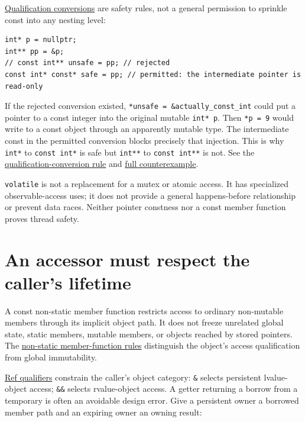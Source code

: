 \hyperref[appendix-5e1a7561cd98]{Qualification conversions} are safety rules, not a general permission to sprinkle const into any nesting level:

\begin{verbatim}
int* p = nullptr;
int** pp = &p;
// const int** unsafe = pp; // rejected
const int* const* safe = pp; // permitted: the intermediate pointer is read-only
\end{verbatim}

If the rejected conversion existed, \texttt{*unsafe\ =\ \&actually\_const\_int} could put a pointer to a const integer into the original mutable \texttt{int*\ p}. Then \texttt{*p\ =\ 9} would write to a const object through an apparently mutable type. The intermediate const in the permitted conversion blocks precisely that injection. This is why \texttt{int*} to \texttt{const\ int*} is safe but \texttt{int**} to \texttt{const\ int**} is not. See the \href{https://eel.is/c++draft/conv.qual}{qualification-conversion rule} and \hyperref[01-foundations-i-ch011-c---qualification-safety-and-borrow-intervals]{full counterexample}.

\texttt{volatile} is not a replacement for a mutex or atomic access. It has specialized observable-access uses; it does not provide a general happens-before relationship or prevent data races. Neither pointer constness nor a const member function proves thread safety.

\section{An accessor must respect the caller's lifetime}\label{01-foundations-i-ch003-an-accessor-must-respect-the-callers-lifetime}

\hypertarget{01-foundations-i-ch003-an-accessor-must-respect-the-callers-lifetime}{}

A const non-static member function restricts access to ordinary non-mutable members through its implicit object path. It does not freeze unrelated global state, static members, mutable members, or objects reached by stored pointers. The \href{https://eel.is/c++draft/class.mfct.non.static}{non-static member-function rules} distinguish the object's access qualification from global immutability.

\hyperref[appendix-d42039b1d6f7]{Ref qualifiers} constrain the caller's object category: \texttt{\&} selects persistent lvalue-object access; \texttt{\&\&} selects rvalue-object access. A getter returning a borrow from a temporary is often an avoidable design error. Give a persistent owner a borrowed member path and an expiring owner an owning result:

